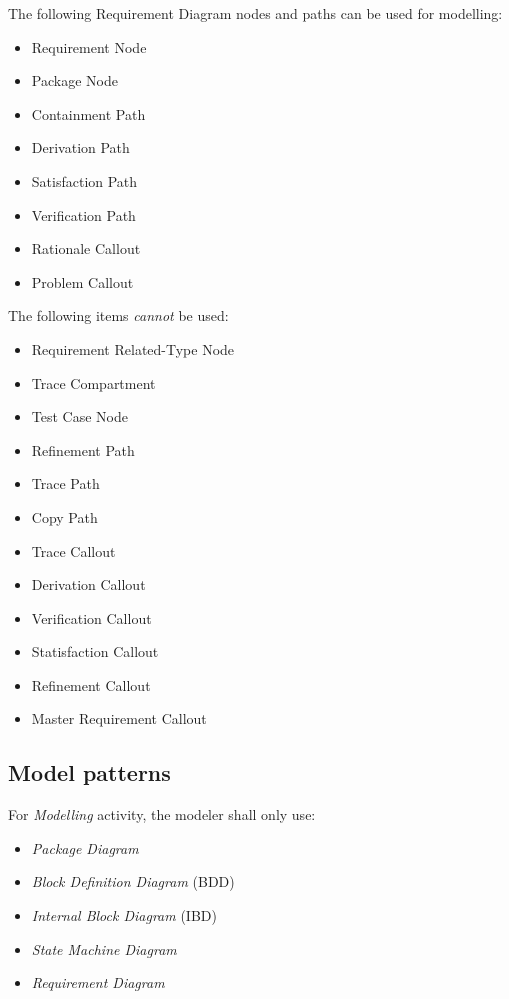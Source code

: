 The following Requirement Diagram nodes and paths can be used for
modelling:
\begin{itemize}
\item Requirement Node 
\item Package Node
\item Containment Path
\item Derivation Path 
\item Satisfaction Path 
\item Verification Path 
\item Rationale Callout 
\item Problem Callout 
\end{itemize}

The following items \emph{cannot} be used:
\begin{itemize}
\item Requirement Related-Type Node
\item Trace Compartment
\item Test Case Node
\item Refinement Path
\item Trace Path
\item Copy Path
\item Trace Callout
\item Derivation Callout
\item Verification Callout
\item Statisfaction Callout
\item Refinement Callout
\item Master Requirement Callout
\end{itemize}



\subsection{Model patterns}

For \emph{Modelling} activity, the modeler shall only use:
\begin{itemize}
\item \emph{Package Diagram}
\item \emph{Block Definition Diagram} (BDD)
\item \emph{Internal Block Diagram} (IBD)
\item \emph{State Machine Diagram}
\item \emph{Requirement Diagram}
\end{itemize}

